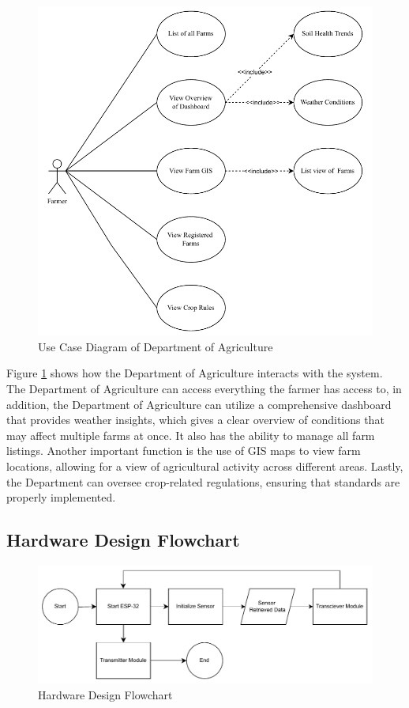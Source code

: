 {	\begin{figure}[H]
		\centering
		\caption{Use Case Diagram of Department of Agriculture}
		\label{fig:DAUseCase}
		\includegraphics[width=1\textwidth]{figures/DAUseCase.pdf}
	\end{figure}
	
	Figure \ref{fig:DAUseCase} shows how the Department of Agriculture interacts with the system. The Department of Agriculture can access everything the farmer has access to, in addition, the Department of Agriculture can utilize a comprehensive dashboard that provides weather insights, which gives a clear overview of conditions that may affect multiple farms at once.  It also has the ability to manage all farm listings. Another important function is the use of GIS maps to view farm locations, allowing for a view of agricultural activity across different areas. Lastly, the Department can oversee crop-related regulations, ensuring that standards are properly implemented.
	
	\subsection{Hardware Design Flowchart}
	\begin{figure}[H]
		\centering
		\caption{Hardware Design Flowchart}
		\label{fig:HardwareFlowchart}
		\includegraphics[width=1\textwidth]{figures/hardwarediagram.pdf}
	\end{figure}
	
}
